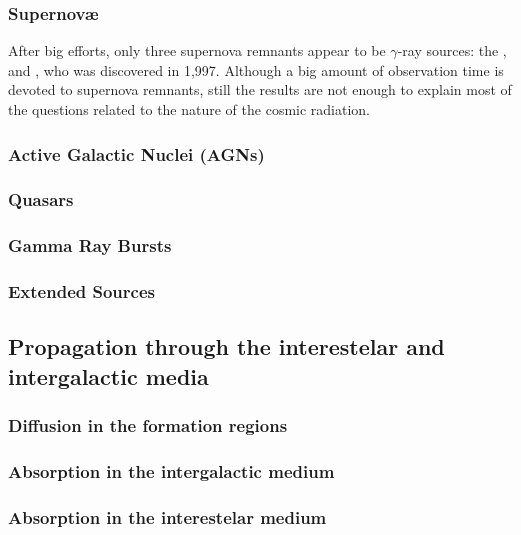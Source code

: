 \subsubsection{Supernov\ae}

After big efforts, only three supernova remnants appear to be
$\gamma$-ray sources: the ,  and ,
who was discovered in 1,997. Although a big amount of observation time
is devoted to supernova remnants, still the results are not enough to
explain most of the questions related to the nature of the cosmic
radiation.

\subsubsection{Active Galactic Nuclei (AGNs)}

\subsubsection{Quasars}

\subsubsection{Gamma Ray Bursts}

\subsubsection{Extended Sources}

\subsection{Propagation through the interestelar and
intergalactic media}

\gsourcesfig

\gsnumbersfig

\subsubsection{Diffusion in the formation regions}

\subsubsection{Absorption in the intergalactic medium}

\subsubsection{Absorption in the interestelar medium}


